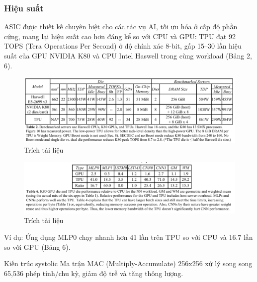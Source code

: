 \documentclass[a4paper]{article}
\begin{document}
\subsubsection{Hiệu suất}
ASIC được thiết kế chuyên biệt cho các tác vụ AI, tối ưu hóa ở cấp độ phần cứng, mang lại hiệu suất cao hơn đáng kể so với CPU và GPU:
TPU đạt 92 TOPS (Tera Operations Per Second) ở độ chính xác 8-bit, gấp 15–30 lần hiệu suất của GPU NVIDIA K80 và CPU Intel Haswell trong cùng workload (Bảng 2, 6).
\begin{figure}
    \centering
    \includegraphics[width=1\linewidth]{assets/table-asic-1.png}
    \caption{Trích tài liệu}
    \label{fig:enter-label}
\end{figure}
\begin{figure}
    \centering
    \includegraphics[width=1\linewidth]{assets/table-asic-2.png}
    \caption{Trích tài liệu}
    \label{fig:enter-label}
\end{figure}

Ví dụ: Ứng dụng MLP0 chạy nhanh hơn 41 lần trên TPU so với CPU và 16.7 lần so với GPU (Bảng 6).

Kiến trúc systolic
	Ma trận MAC (Multiply-Accumulate) 256x256 xử lý song song 65,536 phép tính/chu kỳ, giảm độ trễ và tăng thông lượng.
\end{document}
